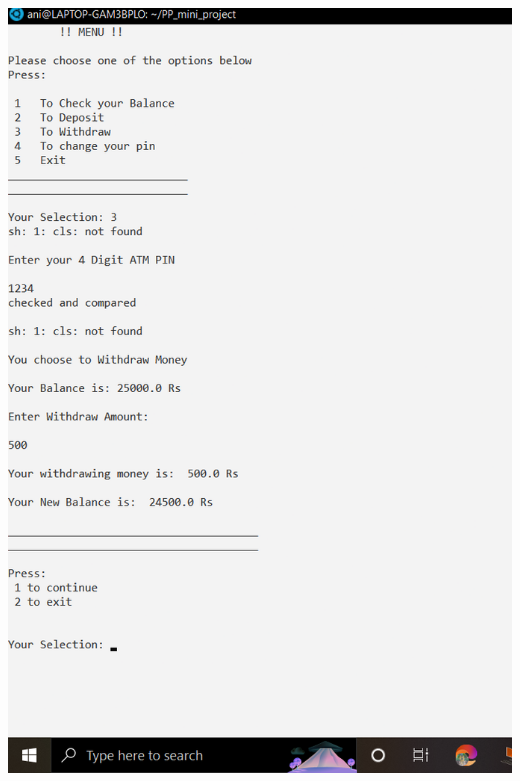 \documentclass{article}
\begin{document}
\includegraphics[scale=0.35]{output_py_2.png}  \\ \\
\end{document}
